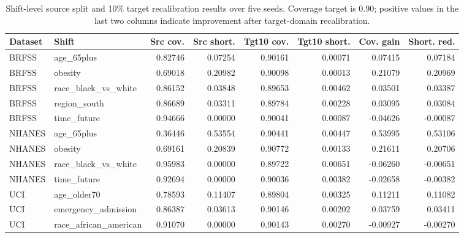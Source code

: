 \begin{table}[!tbp]
\centering
\caption{Shift-level source split and 10\% target recalibration results over five seeds. Coverage target is 0.90; positive values in the last two columns indicate improvement after target-domain recalibration.}
\label{tab:shift_level_results}
\scriptsize
\setlength{\tabcolsep}{3pt}
\begin{adjustbox}{max width=\textwidth}
\begin{tabular}{llrrrrrr}
\toprule
Dataset & Shift & Src cov. & Src short. & Tgt10 cov. & Tgt10 short. & Cov. gain & Short. red. \\
\midrule
BRFSS & age\_65plus & 0.82746 & 0.07254 & 0.90161 & 0.00071 & 0.07415 & 0.07184 \\
BRFSS & obesity & 0.69018 & 0.20982 & 0.90098 & 0.00013 & 0.21079 & 0.20969 \\
BRFSS & race\_black\_vs\_white & 0.86152 & 0.03848 & 0.89653 & 0.00462 & 0.03501 & 0.03387 \\
BRFSS & region\_south & 0.86689 & 0.03311 & 0.89784 & 0.00228 & 0.03095 & 0.03084 \\
BRFSS & time\_future & 0.94666 & 0.00000 & 0.90041 & 0.00087 & -0.04626 & -0.00087 \\
NHANES & age\_65plus & 0.36446 & 0.53554 & 0.90441 & 0.00447 & 0.53995 & 0.53106 \\
NHANES & obesity & 0.69161 & 0.20839 & 0.90772 & 0.00133 & 0.21611 & 0.20706 \\
NHANES & race\_black\_vs\_white & 0.95983 & 0.00000 & 0.89722 & 0.00651 & -0.06260 & -0.00651 \\
NHANES & time\_future & 0.92694 & 0.00000 & 0.90036 & 0.00382 & -0.02658 & -0.00382 \\
UCI & age\_older70 & 0.78593 & 0.11407 & 0.89804 & 0.00325 & 0.11211 & 0.11082 \\
UCI & emergency\_admission & 0.86387 & 0.03613 & 0.90146 & 0.00202 & 0.03759 & 0.03411 \\
UCI & race\_african\_american & 0.91070 & 0.00000 & 0.90143 & 0.00270 & -0.00927 & -0.00270 \\
\bottomrule
\end{tabular}
\end{adjustbox}
\end{table}

